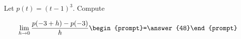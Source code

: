 \documentclass{ximera}
\author{Bart Snapp}
\begin{document}
\begin{exercise}
Let $p(t) = (t-1)^3$. Compute

\[
\lim_{ h\to 0 } \frac{p(-3+h)-p(-3)}{h} \begin{prompt}=\answer{48}\end{prompt}
\]
\end{exercise}
\end{document}
